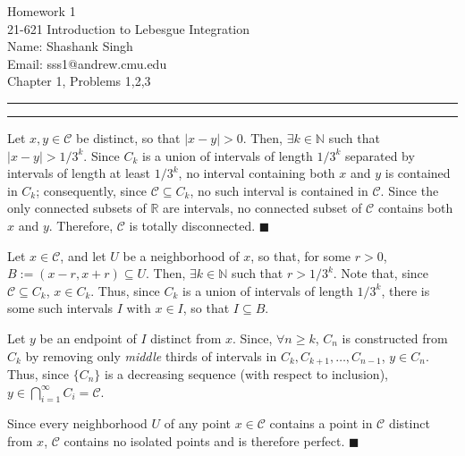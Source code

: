 \documentclass[11pt]{article}
\makeatletter
\newcounter{questionCounter}
\newcounter{partCounter}[questionCounter]
\newenvironment{question}[2][\arabic{questionCounter}]{%
    \setcounter{partCounter}{0}%
    \vspace{.25in} \hrule \vspace{0.5em}%
        \noindent{\bf #2}%
    \vspace{0.8em} \hrule \vspace{.10in}%
    \addtocounter{questionCounter}{1}%
}{}
\newcommand{\myname}{Shashank Singh}
\newcommand{\myandrew}{sss1@andrew.cmu.edu}
\newcommand{\myclass}{21-621 Introduction to Lebesgue Integration}
\newcommand{\myhwnum}{1}
\newcommand{\duedate}{Friday, November 2, 2012}
\newcommand{\problemlist}{Chapter 1, Problems 1,2,3}
\renewcommand{\qed}{\quad $\blacksquare$}
\newcommand{\N}{\mathbb{N}} %
\newcommand{\R}{\mathbb{R}} %
\newcommand{\C}{\mathcal{C}} %
\makeatother
\begin{document}
\thispagestyle{plain}

{\Large Homework \myhwnum} \\
\myclass \\
Name: \myname \\
Email: \myandrew \\
\problemlist
\begin{question}{Chapter 1, Problem 1}
Let $x,y \in \C$ be distinct, so that $|x - y| > 0$. Then, $\exists k \in \N$
such that $|x - y| > 1/3^k$. Since $C_k$ is a union of intervals of length
$1/3^k$ separated by intervals of length at least $1/3^k$,
no interval containing both $x$ and $y$ is contained in $C_k$; consequently,
since $\C \subseteq C_k$, no such interval is contained in $\C$.
Since the only connected subsets of $\R$ are intervals, no connected subset of
$\C$ contains both $x$ and $y$. Therefore, $\C$ is totally disconnected. \qed

Let $x \in \C$, and let $U$ be a neighborhood of $x$, so that, for some
$r > 0$, $B := (x - r,x + r) \subseteq U$. Then, $\exists k \in \N$ such that
$r > 1/3^k$. Note that, since $\C \subseteq C_k$, $x \in C_k$. Thus, since
$C_k$ is a union of intervals of length $1/3^k$, there is some such intervals
$I$ with $x \in I$, so that $I \subseteq B$.

Let $y$ be an endpoint of $I$ distinct from $x$. Since, $\forall n \geq k$,
$C_n$ is constructed from $C_k$ by removing only \emph{middle} thirds of
intervals in $C_k,C_{k + 1},\ldots,C_{n - 1}$, $y \in C_n$. Thus, since
$\{C_n\}$ is a decreasing sequence (with respect to inclusion),
$y \in \bigcap_{i = 1}^{\infty} C_i = \C$.

Since every neighborhood $U$ of any point $x \in \C$ contains a point in $\C$
distinct from $x$, $\C$ contains no isolated points and is therefore perfect.
\qed
\end{question}
\end{document}
